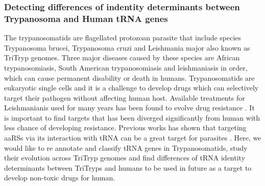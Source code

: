 \documentclass[
10pt, %
a4paper, %
oneside, %
headinclude,footinclude, %
BCOR5mm, %
]{scrartcl}
\begin{document}
\subsubsection*{Detecting differences of indentity determinants between Trypanosoma and Human tRNA genes} 
The trypanosomatids are flagellated protozoan parasite that include species Trypanosoma brucei, Trypanosoma cruzi and Leishmania major also known as TriTryp genomes. Three major diseases caused by these species are African trypanosomiasis,  South American trypanosomiasis and leishmaniasis in order, which can cause permanent disability or death in humans. Trypanosomatids are eukaryotic single cells and it is a challenge to develop drugs which can selectively target their pathogen without affecting human host. Available treatments for Leishmanianis used for many years has been found to evolve drug resistance \cite{Resistance1,Resistance2}. It is important to find targets that has been diverged significantly from human with less chance of developing resistance. Previous works has shown that targeting  aaRSs via its interaction with tRNA can be a great target for parasites \cite{aaRS}. Here, we would like to re annotate and classify tRNA genes in Trypanosomatids, study their evolution across TriTryp genomes and find differences of tRNA identity determinants between TriTryps and humans to be used in future as a target to develop non-toxic drugs for human. 
\newpage
\renewcommand{\refname}{\spacedlowsmallcaps{References}} %




\end{document}
